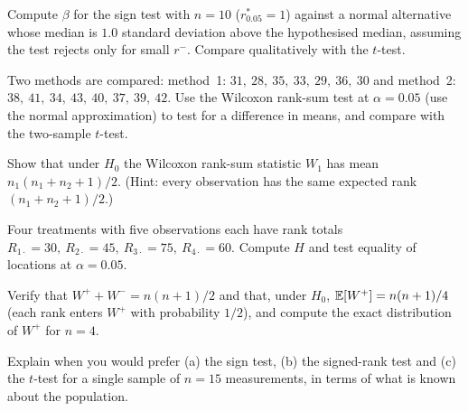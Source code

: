 \begin{exercise}
Compute $\beta$ for the sign test with $n=10$ ($r^*_{0.05}=1$) against a normal alternative whose median is $1.0$ standard deviation above the hypothesised median, assuming the test rejects only for small $r^-$. Compare qualitatively with the $t$-test.
\end{exercise}

\begin{exercise}
Two methods are compared: method~1: $31,\ 28,\ 35,\ 33,\ 29,\ 36,\ 30$ and method~2: $38,\ 41,\ 34,\ 43,\ 40,\ 37,\ 39,\ 42$. Use the Wilcoxon rank-sum test at $\alpha=0.05$ (use the normal approximation) to test for a difference in means, and compare with the two-sample $t$-test.
\end{exercise}

\begin{exercise}
Show that under $H_0$ the Wilcoxon rank-sum statistic $W_1$ has mean $n_1(n_1+n_2+1)/2$. (Hint: every observation has the same expected rank $(n_1+n_2+1)/2$.)
\end{exercise}

\begin{exercise}
Four treatments with five observations each have rank totals $R_{1\cdot}=30,\ R_{2\cdot}=45,\ R_{3\cdot}=75,\ R_{4\cdot}=60$. Compute $H$ and test equality of locations at $\alpha=0.05$.
\end{exercise}

\begin{exercise}
Verify that $W^++W^-=n(n+1)/2$ and that, under $H_0$, $\mathbb{E}[W^+]=n(n+1)/4$ (each rank enters $W^+$ with probability $1/2$), and compute the exact distribution of $W^+$ for $n=4$.
\end{exercise}

\begin{exercise}
Explain when you would prefer (a) the sign test, (b) the signed-rank test and (c) the $t$-test for a single sample of $n=15$ measurements, in terms of what is known about the population.
\end{exercise}
